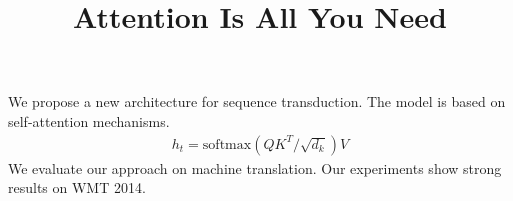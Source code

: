 \documentclass[11pt]{article}
\title{Attention Is All You Need}
\begin{document}
\maketitle
We propose a new architecture for sequence transduction.
The model is based on self-attention mechanisms.
\begin{align}
  h_t = \mathrm{softmax}(QK^T / \sqrt{d_k}) V
\end{align}
We evaluate our approach on machine translation.
Our experiments show strong results on WMT 2014.
\end{document}
